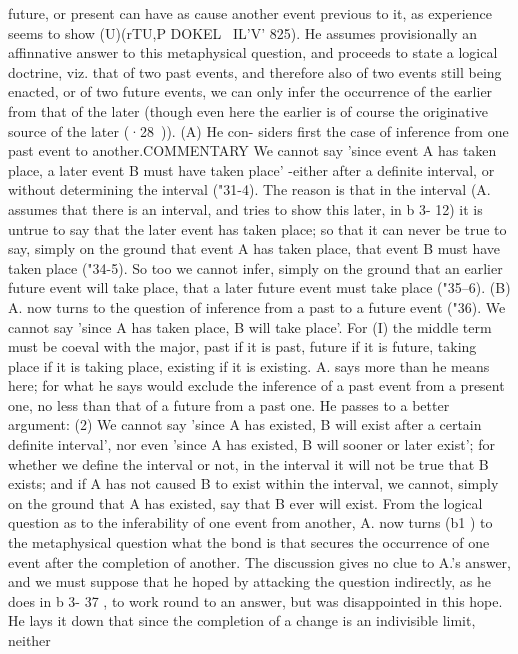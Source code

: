{{{{{{{{{{{{{{{{{{{{{{{{{{{{{{{{{{{{{{{{{{{{{{{{{{{{{{{{{{{{{{{future, or present can have as cause another event previous to it,
as experience seems to show (U)(rTU,P DOKEL ~IL'V' 825). He assumes
provisionally an affinnative answer to this metaphysical question,
and proceeds to state a logical doctrine, viz. that of two past
events, and therefore also of two events still being enacted, or
of two future events, we can only infer the occurrence of the
earlier from that of the later (though even here the earlier is of
course the originative source of the later (·28~)). (A) He con-
siders first the case of inference from one past event to another.COMMENTARY
We cannot say 'since event A has taken place, a later event B
must have taken place' -either after a definite interval, or without
determining the interval ("31-4). The reason is that in the
interval (A. assumes that there is an interval, and tries to show
this later, in b 3- 12) it is untrue to say that the later event has
taken place; so that it can never be true to say, simply on the
ground that event A has taken place, that event B must have
taken place ("34-5). So too we cannot infer, simply on the ground
that an earlier future event will take place, that a later future
event must take place ("35--6).
(B) A. now turns to the question of inference from a past to
a future event ("36). We cannot say 'since A has taken place,
B will take place'. For (I) the middle term must be coeval with
the major, past if it is past, future if it is future, taking place if it
is taking place, existing if it is existing. A. says more than he
means here; for what he says would exclude the inference of a
past event from a present one, no less than that of a future from
a past one. He passes to a better argument: (2) We cannot say
'since A has existed, B will exist after a certain definite interval',
nor even 'since A has existed, B will sooner or later exist'; for
whether we define the interval or not, in the interval it will not
be true that B exists; and if A has not caused B to exist within
the interval, we cannot, simply on the ground that A has existed,
say that B ever will exist.
From the logical question as to the inferability of one event
from another, A. now turns (b1 ) to the metaphysical question
what the bond is that secures the occurrence of one event after
the completion of another. The discussion gives no clue to A.'s
answer, and we must suppose that he hoped by attacking the
question indirectly, as he does in b 3- 37 , to work round to an
answer, but was disappointed in this hope. He lays it down that
since the completion of a change is an indivisible limit, neither
}}}}}}}}}}}}}}}}}}}}}}}}}}}}}}}}}}}}}}}}}}}}}}}}}}}}}}}}}}}}}}}
